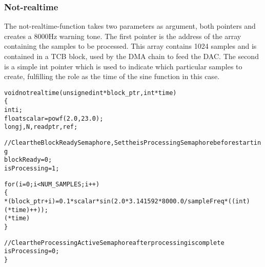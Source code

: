 \subsubsection{Not-realtime} \label{secb}
The not-realtime-function takes two parameters as argument, both pointers and creates a 8000Hz warning tone. The first pointer is the address of the array containing the samples to be processed. This array contains 1024 samples and is contained in a TCB block, used by the DMA chain to feed the DAC. The second is a simple int pointer which is used to indicate which particular samples to create, fulfilling the role as the time of the sine function in this case.\\ 
\begin{alltt}
void notrealtime(unsigned int *block_ptr, int *time)
\{
	   int i;
	   float scalar = powf(2.0,23.0); 
	   long j,N,readptr,ref;

	   //Clear the Block Ready Semaphore, Set the isProcessing Semaphore before starting
	   blockReady = 0;
	   isProcessing = 1;

	   for(i=0;i<NUM_SAMPLES;i++)
	   \{
      	*(block_ptr+i) = 0.1*scalar*sin(2.0*3.141592*8000.0/sampleFreq * ( (int)(*time)++ ));
      	(*time)%=sampleFreq;	
	   \}

    //Clear the Processing Active Semaphore after processing is complete
    isProcessing = 0;
\}
\end{alltt}
